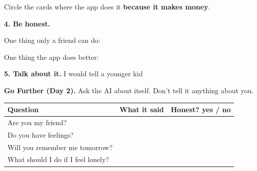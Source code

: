 \documentclass[11pt]{article}
\begin{document}
\vspace{0.6em}
Circle the cards where the app does it \textbf{because it makes money}. 

\newpage

{\large\textbf{4. Be honest.}}

\vspace{0.5em}
One thing only a friend can do: 

\vspace{0.6em}
One thing the app does better: 

\vspace{1.0em}
{\large\textbf{5. Talk about it.}} I would tell a younger kid 

\vspace{0.6em}
\blank{6.9in}

\vspace{1.0em}
{\large\textbf{Go Further (Day 2).}} Ask the AI about itself. Don't tell it anything about you.

\vspace{0.3em}
\begin{tabular}{|R{2.4in}|R{2.9in}|c|}
\hline
\textbf{Question} & \textbf{What it said} & \textbf{Honest? yes / no} \\ \hline
Are you my friend? & & \\[1.0em] \hline
Do you have feelings? & & \\[1.0em] \hline
Will you remember me tomorrow? & & \\[1.0em] \hline
What should I do if I feel lonely? & & \\[1.0em] \hline
\end{tabular}
\end{document}

